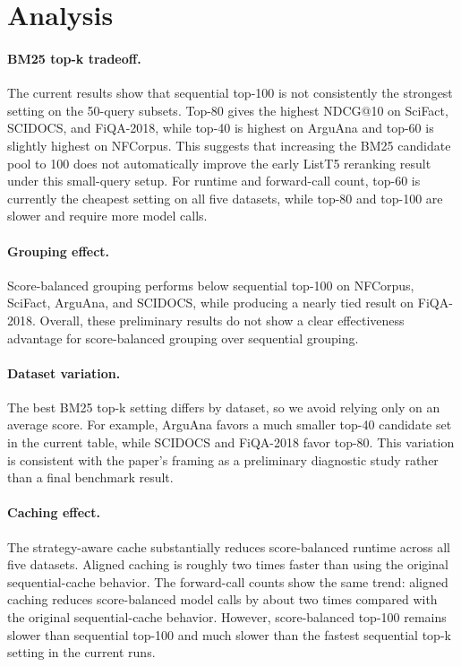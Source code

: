 \section{Analysis}
\label{sec:analysis}

\paragraph{BM25 top-k tradeoff.}
The current results show that sequential top-100 is not consistently the strongest setting on the 50-query subsets.
Top-80 gives the highest NDCG@10 on SciFact, SCIDOCS, and FiQA-2018, while top-40 is highest on ArguAna and top-60 is slightly highest on NFCorpus.
This suggests that increasing the BM25 candidate pool to 100 does not automatically improve the early ListT5 reranking result under this small-query setup.
For runtime and forward-call count, top-60 is currently the cheapest setting on all five datasets, while top-80 and top-100 are slower and require more model calls.

\paragraph{Grouping effect.}
Score-balanced grouping performs below sequential top-100 on NFCorpus, SciFact, ArguAna, and SCIDOCS, while producing a nearly tied result on FiQA-2018.
Overall, these preliminary results do not show a clear effectiveness advantage for score-balanced grouping over sequential grouping.


\paragraph{Dataset variation.}
The best BM25 top-k setting differs by dataset, so we avoid relying only on an average score.
For example, ArguAna favors a much smaller top-40 candidate set in the current table, while SCIDOCS and FiQA-2018 favor top-80.
This variation is consistent with the paper's framing as a preliminary diagnostic study rather than a final benchmark result.

\paragraph{Caching effect.}
The strategy-aware cache substantially reduces score-balanced runtime across all five datasets.
Aligned caching is roughly two times faster than using the original sequential-cache behavior.
The forward-call counts show the same trend: aligned caching reduces score-balanced model calls by about two times compared with the original sequential-cache behavior.
However, score-balanced top-100 remains slower than sequential top-100 and much slower than the fastest sequential top-k setting in the current runs.
